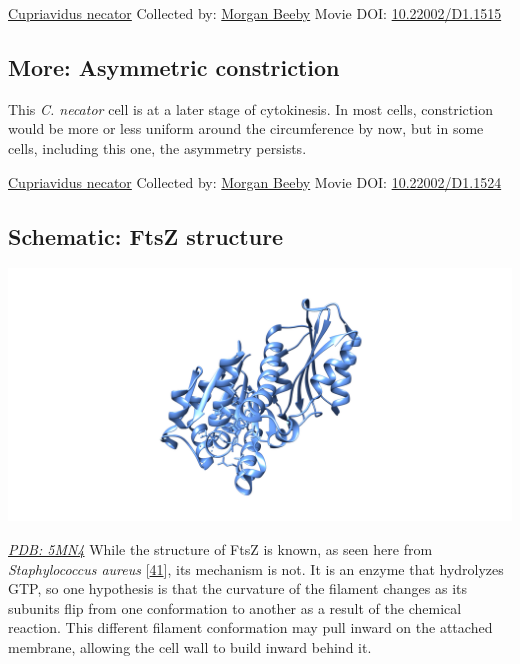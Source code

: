 \documentclass[]{tufte-book}
\begin{document}
\hypertarget{htmlwidget-8cb9f1d5ea143353ef1e}{}

\label{fig:5-9}\protect\hyperlink{tree}{Cupriavidus necator} Collected by: \protect\hyperlink{morgan_beeby}{Morgan Beeby} Movie DOI: \href{https://doi.org/10.22002/D1.1515}{10.22002/D1.1515}

\hypertarget{Asymmetric_constriction}{%
\subsection*{More: Asymmetric constriction}\label{Asymmetric_constriction}}

This \emph{C. necator} cell is at a later stage of cytokinesis. In most cells, constriction would be more or less uniform around the circumference by now, but in some cells, including this one, the asymmetry persists.



\hypertarget{htmlwidget-7e406c6ae94072ceb3cd}{}

\label{fig:5-9a}\protect\hyperlink{tree}{Cupriavidus necator} Collected by: \protect\hyperlink{morgan_beeby}{Morgan Beeby} Movie DOI: \href{https://doi.org/10.22002/D1.1524}{10.22002/D1.1524}

\hypertarget{FtsZ_structure}{%
\subsection*{Schematic: FtsZ structure}\label{FtsZ_structure}}

\includegraphics{img/schematics/5_9_1}

\href{http://rcsb.org/structure/5MN4}{\emph{PDB: 5MN4}}
While the structure of FtsZ is known, as seen here from \emph{Staphylococcus aureus} {[}\protect\hyperlink{ref-wagstaff2017}{41}{]}, its mechanism is not. It is an enzyme that hydrolyzes GTP, so one hypothesis is that the curvature of the filament changes as its subunits flip from one conformation to another as a result of the chemical reaction. This different filament conformation may pull inward on the attached membrane, allowing the cell wall to build inward behind it.
\end{document}
